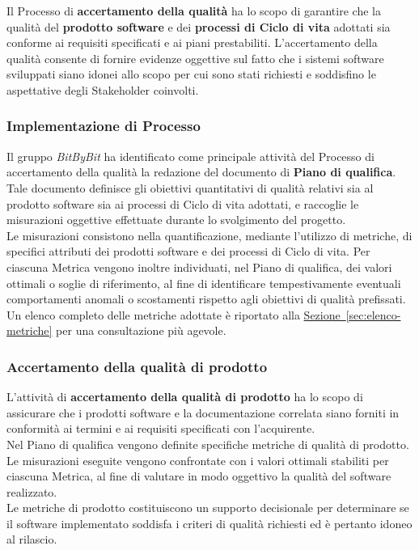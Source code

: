 \documentclass[a4paper,12pt]{article}
\begin{document}
Il Processo di \textbf{accertamento della qualità} ha lo scopo di garantire che la qualità del \textbf{prodotto software} e dei \textbf{processi di Ciclo di vita} adottati sia conforme ai requisiti specificati e ai piani prestabiliti.
L’accertamento della qualità consente di fornire evidenze oggettive sul fatto che i sistemi software sviluppati siano idonei allo scopo per cui sono stati richiesti e soddisfino le aspettative degli Stakeholder coinvolti.

\subsubsection{Implementazione di Processo}
Il gruppo \textit{BitByBit} ha identificato come principale attività del Processo di accertamento della qualità la redazione del documento di \textbf{Piano di qualifica}.
Tale documento definisce gli obiettivi quantitativi di qualità relativi sia al prodotto software sia ai processi di Ciclo di vita adottati, e raccoglie le misurazioni oggettive effettuate durante lo svolgimento del progetto.\\
Le misurazioni consistono nella quantificazione, mediante l’utilizzo di metriche, di specifici attributi dei prodotti software e dei processi di Ciclo di vita.
Per ciascuna Metrica vengono inoltre individuati, nel Piano di qualifica, dei valori ottimali o soglie di riferimento, al fine di identificare tempestivamente eventuali comportamenti anomali o scostamenti rispetto agli obiettivi di qualità prefissati.\\
Un elenco completo delle metriche adottate è riportato alla \hyperref[sec:elenco-metriche]{Sezione~\ref*{sec:elenco-metriche}} per una consultazione più agevole.

\subsubsection{Accertamento della qualità di prodotto}
L’attività di \textbf{accertamento della qualità di prodotto} ha lo scopo di assicurare che i prodotti software e la documentazione correlata siano forniti in conformità ai termini e ai requisiti specificati con l’acquirente.\\
Nel Piano di qualifica vengono definite specifiche metriche di qualità di prodotto.
Le misurazioni eseguite vengono confrontate con i valori ottimali stabiliti per ciascuna Metrica, al fine di valutare in modo oggettivo la qualità del software realizzato.\\
Le metriche di prodotto costituiscono un supporto decisionale per determinare se il software implementato soddisfa i criteri di qualità richiesti ed è pertanto idoneo al rilascio.
\end{document}

